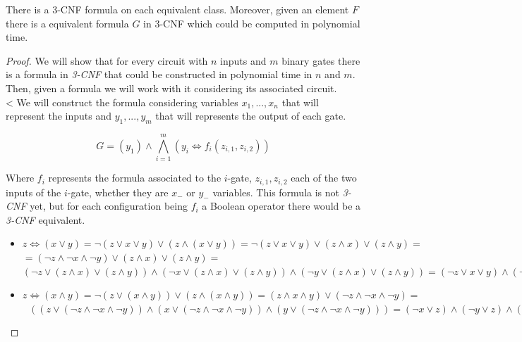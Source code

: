  \begin{theorem} \label{the:Tseitin}
    There is a 3-CNF formula on each equivalent class. Moreover, given an element $F$  there is a equivalent formula $G$  in 3-CNF which could be computed in polynomial time. 
  \end{theorem}

  \begin{proof}
    We will show that for every circuit with $n$ inputs and $m$ binary gates there is a formula in \emph{3-CNF}  that could be constructed in polynomial time in $n$ and $m$. Then, given a formula we will work with it considering its associated circuit.\\
    <
    We will construct the formula considering variables $x_1,...,x_n$ that will represent the inputs and $y_1,...,y_m$ that will represents the output of each gate. 

    $$ G = (y_1) \wedge \bigwedge_{i=1}^m (y_i \iff f_i(z_{i,1},z_{i,2}))$$

    Where $f_i$ represents the formula associated to the $i$-gate, $z_{i,1},z_{i,2}$ each of the two inputs of the $i$-gate, whether they are $x_-$ or $y_-$ variables. This formula is not \emph{3-CNF} yet, but for each configuration being $f_i$ a Boolean operator there would be a \emph{3-CNF} equivalent.

    \begin{itemize}
    \item $z \iff( x \vee y )  = \neg  ( z \vee  x \vee y    ) \vee (z \wedge ( x \vee y )  ) = \neg  ( z \vee  x \vee y    ) \vee (z \wedge x)  \vee (z \wedge y ) =$\\$= ( \neg  z \wedge  \neg  x \wedge \neg   y    ) \vee (z \wedge x)  \vee (z \wedge y )  =$$
      (\neg  z \vee (z \wedge x)  \vee (z \wedge y ))  \wedge  
      (\neg  x \vee (z \wedge x)  \vee (z \wedge y )) \wedge
      (\neg  y \vee (z \wedge x)  \vee (z \wedge y ))   =
      (\neg  z \vee x  \vee y )  \wedge  
      (\neg  x \vee z  ) \wedge
      (\neg  y \vee z ) $   
    \item $z \iff( x \wedge y ) = \neg ( z \vee ( x \wedge y )) \vee (z \wedge ( x \wedge y )) = (z\wedge x \wedge y ) \vee  (\neg  z\wedge \neg  x \wedge \neg  y )  =$\\$\ \ \ ((z\vee  (\neg  z\wedge \neg  x \wedge \neg  y )  ) \wedge (x \vee  (\neg  z\wedge \neg  x \wedge \neg  y )  ) \wedge (y\vee  (\neg  z\wedge \neg  x \wedge \neg  y )  ) ) = (\neg  x \vee z) \wedge (\neg  y \vee z ) \wedge (\neg  z \vee x ) \wedge (\neg  y \vee x ) \wedge(\neg  z\vee y )\wedge (\neg  x\vee y )$
      

\end{itemize}
\end{proof}
